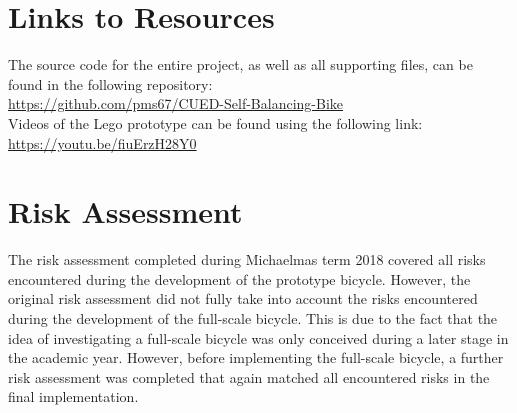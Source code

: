 \begin{appendices}
\section{Links to Resources}
The source code for the entire project, as well as all supporting files, can be found in the following repository: \\
\url{https://github.com/pms67/CUED-Self-Balancing-Bike} \\

Videos of the Lego prototype can be found using the following link: \\
\url{https://youtu.be/fiuErzH28Y0}

\section{Risk Assessment}
The risk assessment completed during Michaelmas term 2018 covered all risks encountered during the development of the prototype bicycle. However, the original risk assessment did not fully take into account the risks encountered during the development of the full-scale bicycle. This is due to the fact that the idea of investigating a full-scale bicycle was only conceived during a later stage in the academic year. However, before implementing the full-scale bicycle, a further risk assessment was completed that again matched all encountered risks in the final implementation.
\end{appendices}